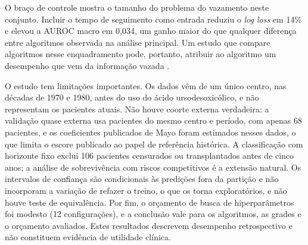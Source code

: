 O braço de controle mostra o tamanho do problema do vazamento neste conjunto. Incluir o tempo de seguimento como entrada reduziu o \textit{log loss} em 14\% e elevou a AUROC macro em 0,034, um ganho maior do que qualquer diferença entre algoritmos observada na análise principal. Um estudo que compare algoritmos nesse enquadramento pode, portanto, atribuir ao algoritmo um desempenho que vem da informação vazada \cite{kapoor2023leakage}.

O estudo tem limitações importantes. Os dados vêm de um único centro, nas décadas de 1970 e 1980, antes do uso do ácido ursodesoxicólico, e não representam os pacientes atuais. Não houve coorte externa verdadeira: a validação quase externa usa pacientes do mesmo centro e período, com apenas 68 pacientes, e os coeficientes publicados de Mayo foram estimados nesses dados, o que limita o escore publicado ao papel de referência histórica. A classificação com horizonte fixo exclui 106 pacientes censurados ou transplantados antes de cinco anos; a análise de sobrevivência com riscos competitivos é a extensão natural. Os intervalos de confiança são condicionais às predições fora da partição e não incorporam a variação de refazer o treino, o que os torna exploratórios, e não houve teste de equivalência. Por fim, o orçamento de busca de hiperparâmetros foi modesto (12 configurações), e a conclusão vale para os algoritmos, as grades e o orçamento avaliados. Estes resultados descrevem desempenho retrospectivo e não constituem evidência de utilidade clínica.
